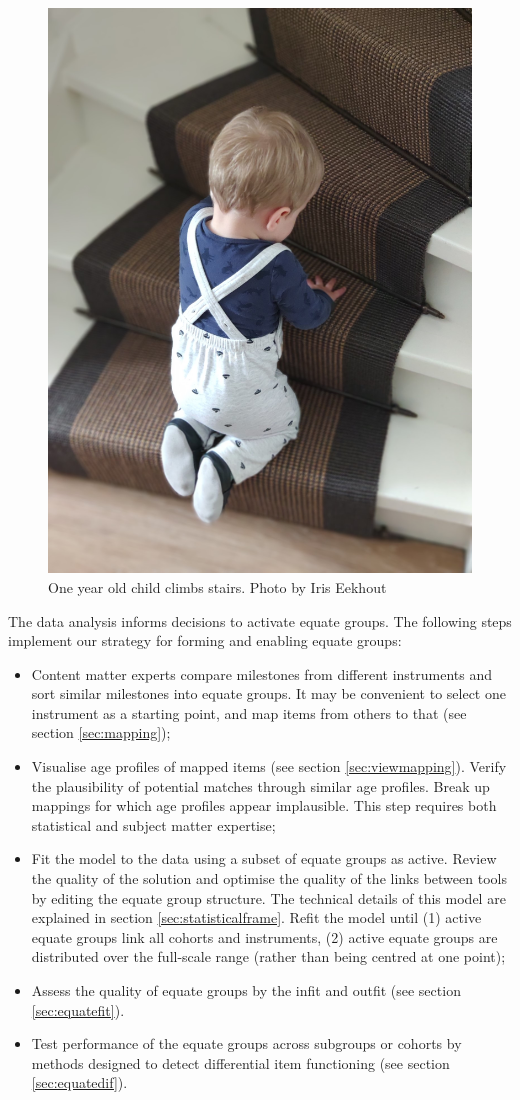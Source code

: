\documentclass[
]{book}
\providecommand{\tightlist}{%
  \setlength{\itemsep}{0pt}\setlength{\parskip}{0pt}}
\begin{document}
\begin{figure}

{\centering \includegraphics[width=0.5\linewidth]{fig/otis-stairs} 

}

\caption{One year old child climbs stairs. Photo by Iris Eekhout}\label{fig:stairpic}
\end{figure}



The data analysis informs decisions to activate equate groups. The following steps implement our strategy for forming and enabling equate groups:

\begin{itemize}
\tightlist
\item
  Content matter experts compare milestones from different instruments and sort similar milestones into equate groups. It may be convenient to select one instrument as a starting point, and map items from others to that (see section \ref{sec:mapping});
\item
  Visualise age profiles of mapped items (see section \ref{sec:viewmapping}). Verify the plausibility of potential matches through similar age profiles. Break up mappings for which age profiles appear implausible. This step requires both statistical and subject matter expertise;
\item
  Fit the model to the data using a subset of equate groups as active. Review the quality of the solution and optimise the quality of the links between tools by editing the equate group structure. The technical details of this model are explained in section \ref{sec:statisticalframe}. Refit the model until (1) active equate groups link all cohorts and instruments, (2) active equate groups are distributed over the full-scale range (rather than being centred at one point);
\item
  Assess the quality of equate groups by the infit and outfit (see section \ref{sec:equatefit}).
\item
  Test performance of the equate groups across subgroups or cohorts by methods designed to detect differential item functioning (see section \ref{sec:equatedif}).
\end{itemize}
\end{document}
